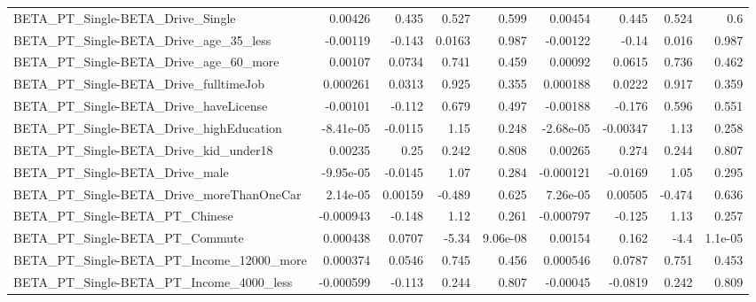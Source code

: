 \begin{tabular}{lrrrrrrrr}
BETA\_PT\_Single-BETA\_Drive\_Single                   &     0.00426 &        0.435 &    0.527 &    0.599 &    0.00454 &       0.445 &        0.524 &           0.6 \\
BETA\_PT\_Single-BETA\_Drive\_age\_35\_less              &    -0.00119 &       -0.143 &   0.0163 &    0.987 &   -0.00122 &       -0.14 &        0.016 &         0.987 \\
BETA\_PT\_Single-BETA\_Drive\_age\_60\_more              &     0.00107 &       0.0734 &    0.741 &    0.459 &    0.00092 &      0.0615 &        0.736 &         0.462 \\
BETA\_PT\_Single-BETA\_Drive\_fulltimeJob              &    0.000261 &       0.0313 &    0.925 &    0.355 &   0.000188 &      0.0222 &        0.917 &         0.359 \\
BETA\_PT\_Single-BETA\_Drive\_haveLicense              &    -0.00101 &       -0.112 &    0.679 &    0.497 &   -0.00188 &      -0.176 &        0.596 &         0.551 \\
BETA\_PT\_Single-BETA\_Drive\_highEducation            &   -8.41e-05 &      -0.0115 &     1.15 &    0.248 &  -2.68e-05 &    -0.00347 &         1.13 &         0.258 \\
BETA\_PT\_Single-BETA\_Drive\_kid\_under18              &     0.00235 &         0.25 &    0.242 &    0.808 &    0.00265 &       0.274 &        0.244 &         0.807 \\
BETA\_PT\_Single-BETA\_Drive\_male                     &   -9.95e-05 &      -0.0145 &     1.07 &    0.284 &  -0.000121 &     -0.0169 &         1.05 &         0.295 \\
BETA\_PT\_Single-BETA\_Drive\_moreThanOneCar           &    2.14e-05 &      0.00159 &   -0.489 &    0.625 &   7.26e-05 &     0.00505 &       -0.474 &         0.636 \\
BETA\_PT\_Single-BETA\_PT\_Chinese                     &   -0.000943 &       -0.148 &     1.12 &    0.261 &  -0.000797 &      -0.125 &         1.13 &         0.257 \\
BETA\_PT\_Single-BETA\_PT\_Commute                     &    0.000438 &       0.0707 &    -5.34 & 9.06e-08 &    0.00154 &       0.162 &         -4.4 &       1.1e-05 \\
BETA\_PT\_Single-BETA\_PT\_Income\_12000\_more           &    0.000374 &       0.0546 &    0.745 &    0.456 &   0.000546 &      0.0787 &        0.751 &         0.453 \\
BETA\_PT\_Single-BETA\_PT\_Income\_4000\_less            &   -0.000599 &       -0.113 &    0.244 &    0.807 &   -0.00045 &     -0.0819 &        0.242 &         0.809 \\

\end{tabular}
